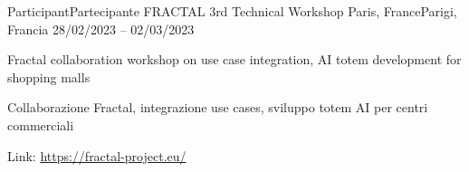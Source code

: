 \begin{cventries}

\cventry
{\ifenglish Participant\else Partecipante\fi} %
{FRACTAL 3rd Technical Workshop} %
{\ifenglish Paris, France\else Parigi, Francia\fi} %
{28/02/2023 -- 02/03/2023} %
{ %
\begin{cvitems}
\ifenglish
\item {Fractal collaboration workshop on use case integration, AI totem development for shopping malls}
\else
\item {Collaborazione Fractal, integrazione use cases, sviluppo totem AI per centri commerciali}
\fi
\item {Link: \url{https://fractal-project.eu/}}
\end{cvitems}
}


\end{cventries}